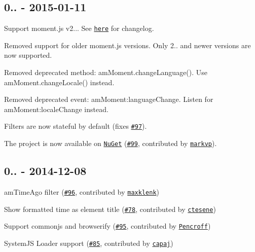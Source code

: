 \subsection*{0.. -\/ 2015-\/01-\/11}


\begin{DoxyItemize}
\item Support moment.\+js v2... See \href{https://gist.github.com/ichernev/0c9a9b49951111a27ce7}{\tt here} for changelog.
\item Removed support for older moment.\+js versions. Only 2.. and newer versions are now supported.
\item Removed deprecated method\+: {\ttfamily am\+Moment.\+change\+Language()}. Use {\ttfamily am\+Moment.\+change\+Locale()} instead.
\item Removed deprecated event\+: {\ttfamily am\+Moment\+:language\+Change}. Listen for {\ttfamily am\+Moment\+:locale\+Change} instead.
\item Filters are now stateful by default (fixes \href{https://github.com/urish/angular-moment/issues/97}{\tt \#97}).
\item The project is now available on \href{https://www.nuget.org/packages/angular-moment/}{\tt Nu\+Get} (\href{https://github.com/urish/angular-moment/pull/99}{\tt \#99}, contributed by \href{https://github.com/markvp}{\tt markvp}).
\end{DoxyItemize}

\subsection*{0.. -\/ 2014-\/12-\/08}


\begin{DoxyItemize}
\item {\ttfamily am\+Time\+Ago} filter (\href{https://github.com/urish/angular-moment/pull/96}{\tt \#96}, contributed by \href{https://github.com/maxklenk}{\tt maxklenk})
\item Show formatted time as element title (\href{https://github.com/urish/angular-moment/pull/78}{\tt \#78}, contributed by \href{https://github.com/ctesene}{\tt ctesene})
\item Support commonjs and browserify (\href{https://github.com/urish/angular-moment/pull/95}{\tt \#95}, contributed by \href{https://github.com/Pencroff}{\tt Pencroff})
\item System\+JS Loader support (\href{https://github.com/urish/angular-moment/pull/85}{\tt \#85}, contributed by \href{https://github.com/capaj}{\tt capaj})
\end{DoxyItemize}

